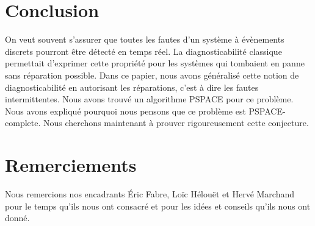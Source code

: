 \documentclass[conference]{IEEEtran}
\begin{document}
%



\section{Conclusion}
On veut souvent s'assurer que toutes les fautes d'un système à évènements discrets pourront être détecté en temps réel. La diagnosticabilité classique permettait d'exprimer cette propriété pour les systèmes qui tombaient en panne sans réparation possible. Dans ce papier, nous avons généralisé cette notion de diagnosticabilit\'e en autorisant les réparations, c'est à dire les fautes intermittentes. Nous 
avons trouv\'e un algorithme PSPACE pour ce probl\`eme. Nous avons expliqué pourquoi nous pensons que ce problème est PSPACE-complete. Nous cherchons maintenant à prouver rigoureusement cette conjecture.






\section*{Remerciements}
Nous remercions nos encadrants \'Eric Fabre, Loïc Hélouët et Hervé Marchand pour le temps qu'ils nous ont consacré et pour les idées et conseils qu'ils nous ont donné.
\end{document}
